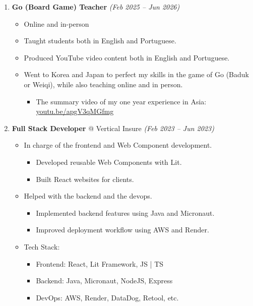 \documentclass[14pt]{extarticle}
\renewcommand{\_}{\leavevmode\kern.06em\vbox{\hrule width.425em}}
\begin{document}
\begin{enumerate}
  \item \textbf{Go (Board Game) Teacher} \textit{(Feb 2025 -- Jun 2026)}
    \begin{itemize}
      \item Online and in-person
      \item Taught students both in English and Portuguese.
      \item Produced YouTube video content both in English and Portuguese.
      \item Went to Korea and Japan to perfect my skills in the game of Go (Baduk or Weiqi), while also teaching online and in person. 
      \begin{itemize}
        \item The summary video of my one year experience in Asia: \\ \href{https://youtu.be/apgV3qMGfmg}{youtu.be/apgV3qMGfmg} 
      \end{itemize}
    \end{itemize}

  \item \textbf{Full Stack Developer} @ Vertical Insure \textit{(Feb 2023 -- Jun 2023)}
    \begin{itemize}
      \item In charge of the frontend and Web Component development.
        \begin{itemize}
          \item Developed reusable Web Components with Lit.
          \item Built React websites for clients.
        \end{itemize}
      \item Helped with the backend and the devops.
        \begin{itemize}
          \item Implemented backend features using Java and Micronaut.
          \item Improved deployment workflow using AWS and Render.
        \end{itemize}
      \item Tech Stack:
        \begin{itemize}
          \item Frontend: React, Lit Framework, JS | TS
          \item Backend: Java, Micronaut, NodeJS, Express
          \item DevOps: AWS, Render, DataDog, Retool, etc.
        \end{itemize}
    \end{itemize}


\end{enumerate}
\end{document}
